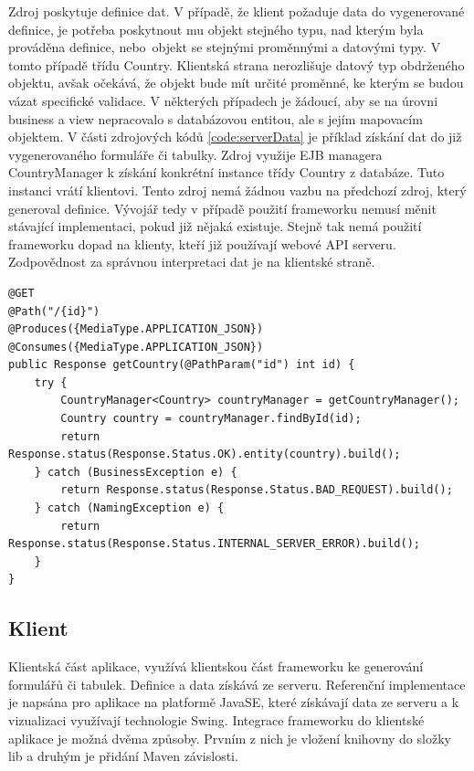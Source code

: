 Zdroj poskytuje definice dat. V případě, že klient požaduje data do vygenerované definice, je potřeba poskytnout mu objekt stejného typu, nad kterým byla prováděna definice, nebo~objekt se stejnými proměnnými a datovými typy. V tomto případě třídu Country. Klientská strana nerozlišuje datový typ obdrženého objektu, avšak očekává, že objekt bude mít určité proměnné, ke kterým se budou vázat specifické validace. V některých případech je žádoucí, aby se na úrovni business a view nepracovalo s databázovou entitou, ale s jejím mapovacím objektem. V části zdrojových kódů \ref{code:serverData} je příklad získání dat do již vygenerovaného formuláře či tabulky. Zdroj využije EJB \cite{javaEE} managera CountryManager k získání konkrétní instance třídy Country z databáze. Tuto instanci vrátí klientovi. Tento zdroj nemá žádnou vazbu na předchozí zdroj, který generoval definice. Vývojář tedy v případě použití frameworku nemusí měnit stávající implementaci, pokud již nějaká existuje. Stejně tak nemá použití frameworku dopad na klienty, kteří již používají webové API serveru. Zodpovědnost za správnou interpretaci dat je na klientské straně.
\begin{lstlisting}[caption=Zdroj poskytující konkrétní instanci třídy Country,
label={code:serverData}, basicstyle=\footnotesize]
@GET
@Path("/{id}")
@Produces({MediaType.APPLICATION_JSON})
@Consumes({MediaType.APPLICATION_JSON})
public Response getCountry(@PathParam("id") int id) {
	try {
		CountryManager<Country> countryManager = getCountryManager();
		Country country = countryManager.findById(id);
		return Response.status(Response.Status.OK).entity(country).build();
	} catch (BusinessException e) {
		return Response.status(Response.Status.BAD_REQUEST).build();
	} catch (NamingException e) {
		return Response.status(Response.Status.INTERNAL_SERVER_ERROR).build();
	}
}
\end{lstlisting}

\subsection{Klient}
Klientská část aplikace, využívá klientskou část frameworku ke generování formulářů či tabulek. Definice a data získává ze serveru. Referenční implementace je napsána pro aplikace na platformě JavaSE, které získávají data ze serveru a k vizualizaci využívají technologie Swing. Integrace frameworku do klientské aplikace je možná dvěma způsoby. Prvním z nich je vložení knihovny do složky lib a druhým je přidání Maven \cite{maven} závislosti. 

